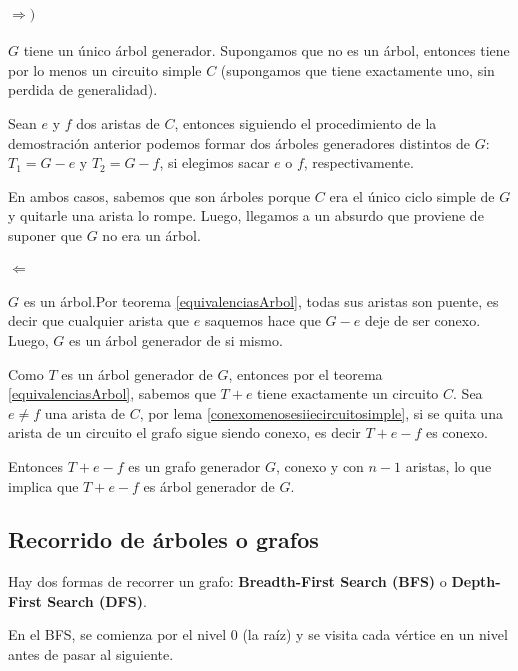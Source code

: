 \begin{demo}[DE 2]
	\paragraph{\(\Rightarrow)\)} \(G\) tiene un único árbol generador. Supongamos que no es un árbol, entonces tiene por lo menos un circuito simple \(C\) (supongamos que tiene exactamente uno, sin perdida de generalidad).

	Sean \(e\) y \(f\) dos aristas de \(C\), entonces siguiendo el procedimiento de la demostración anterior podemos formar dos árboles generadores distintos de \(G\): \(T_1 = G - e\) y \(T_2 = G -f\), si elegimos sacar \(e\) o \(f\), respectivamente.

	En ambos casos, sabemos que son árboles porque \(C\) era el único ciclo simple de \(G\) y quitarle una arista lo rompe. Luego, llegamos a un absurdo que proviene de suponer que \(G\) no era un árbol.

	\paragraph{\(\Leftarrow\)} \(G\) es un árbol.Por teorema \ref{equivalenciasArbol}, todas sus aristas son puente, es decir que cualquier arista que \(e\) saquemos hace que \(G - e\) deje de ser conexo. Luego, \(G\) es un árbol generador de si mismo.
\end{demo}

\begin{demo}[DE 3]
	Como \(T\) es un árbol generador de \(G\), entonces por el teorema \ref{equivalenciasArbol}, sabemos que \(T + e\) tiene exactamente un circuito \(C\). Sea \(e\neq f\) una arista de \(C\), por lema \ref{conexomenosesiiecircuitosimple}, si se quita una arista de un circuito el grafo sigue siendo conexo, es decir \(T + e - f\) es conexo.

	Entonces \(T + e - f\) es un grafo generador \(G\), conexo y con \(n-1\) aristas, lo que implica que \(T + e - f\) es árbol generador de \(G\).
\end{demo}

\subsection{Recorrido de árboles o grafos}\label{algorithm:BFS}
Hay dos formas de recorrer un grafo: \textbf{Breadth-First Search (BFS)} o \textbf{Depth-First Search (DFS)}.

En el BFS, se comienza por el nivel 0 (la raíz) y se visita cada vértice en un nivel antes de pasar al siguiente.

